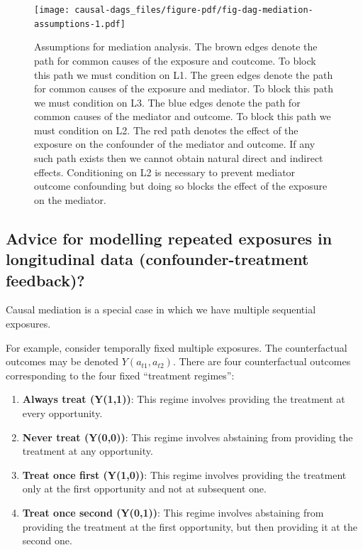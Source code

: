 \documentclass[
  singlecolumn]{report}
\begin{document}
\begin{figure}

{\centering \texttt{[image: causal-dags\_files/figure-pdf/fig-dag-mediation-assumptions-1.pdf]}

}

\caption{\label{fig-dag-mediation-assumptions}Assumptions for mediation
analysis. The brown edges denote the path for common causes of the
exposure and coutcome. To block this path we must condition on L1. The
green edges denote the path for common causes of the exposure and
mediator. To block this path we must condition on L3. The blue edges
denote the path for common causes of the mediator and outcome. To block
this path we must condition on L2. The red path denotes the effect of
the exposure on the confounder of the mediator and outcome. If any such
path exists then we cannot obtain natural direct and indirect effects.
Conditioning on L2 is necessary to prevent mediator outcome confounding
but doing so blocks the effect of the exposure on the mediator.}

\end{figure}

\hypertarget{advice-for-modelling-repeated-exposures-in-longitudinal-data-confounder-treatment-feedback}{%
\subsection{Advice for modelling repeated exposures in longitudinal data
(confounder-treatment
feedback)?}\label{advice-for-modelling-repeated-exposures-in-longitudinal-data-confounder-treatment-feedback}}

Causal mediation is a special case in which we have multiple sequential
exposures.

For example, consider temporally fixed multiple exposures. The
counterfactual outcomes may be denoted \(Y(a_{t1} ,a_{t2})\). There are
four counterfactual outcomes corresponding to the four fixed ``treatment
regimes'':

\begin{enumerate}
\def\labelenumi{\arabic{enumi}.}
\item
  \textbf{Always treat (Y(1,1))}: This regime involves providing the
  treatment at every opportunity.
\item
  \textbf{Never treat (Y(0,0))}: This regime involves abstaining from
  providing the treatment at any opportunity.
\item
  \textbf{Treat once first (Y(1,0))}: This regime involves providing the
  treatment only at the first opportunity and not at subsequent one.
\item
  \textbf{Treat once second (Y(0,1))}: This regime involves abstaining
  from providing the treatment at the first opportunity, but then
  providing it at the second one.
\end{enumerate}
\end{document}

